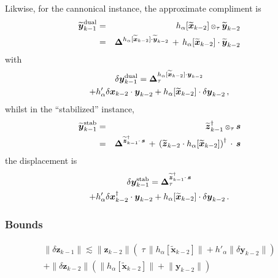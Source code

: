 \documentclass[letterpaper,twocolumn,amsmath,amsfont,amssymb,english,aps,jcp,preprintnumbers,groupaddress,nofootinbib,tightenlines]{revtex4}
\newcommand{\mat}[1]{\boldsymbol{#1}}
\newcommand{\ot}{ {\scriptstyle \otimes}_{ \tau } }
\begin{document}
Likwise,  for the cannonical instance, the approximate compliment is 
\begin{eqnarray}
\widetilde{\mat{y}}^{\rm dual}_{k-1}&=&  
h_\alpha [ \widetilde{\mat{x}}_{k-2}] \, \ot \, \widetilde{\mat{y}}_{k-2}  \\
&=&  \mat{\Delta}^{  h_\alpha[ \widetilde{\mat{x}}_{k-2}] \cdot \widetilde{\mat{y}}_{k-2} }  \, + \,
     h_\alpha[ \widetilde{\mat{x}}_{k-2}] \cdot \widetilde{\mat{y}}_{k-2} 
\end{eqnarray}
with 
\begin{multline}
\delta \mat{y}^{\rm dual}_{k-1}= \mat{\Delta}^{
h_\alpha [ \widetilde{\mat{x}}_{k-2}] \cdot \mat{y}_{k-2} }_\tau  \\ +
h'_\alpha \delta \mat{x}_{k-2} \cdot \mat{y}_{k-2}  
+ h_\alpha [ \widetilde{\mat{x}}_{k-2}] \cdot \delta \mat{y}_{k-2} \, ,
\end{multline}
whilst in the ``stabilized'' instance, 
\begin{eqnarray}
\widetilde{\mat{y}}^{\rm stab}_{k-1} &=& \widetilde{\mat{z}}^{\dagger}_{k-1} \, \ot \, \mat{s} \\
                                  &=& \mat{\Delta}^{\widetilde{\mat{z}}^\dagger_{k-1} \cdot \, \mat{s}} \, + \,
\left( \widetilde{\mat{z}}_{k-2} \cdot h_\alpha[ \widetilde{\mat{x}}_{k-2}] \right)^\dagger \, \cdot \, \mat{s}
\end{eqnarray}
the displacement is
\begin{multline}
\delta \mat{y}^{\rm stab}_{k-1}= \mat{\Delta}^{\widetilde{\mat{z}}^\dagger_{k-1} \cdot \, \mat{s}}_\tau  \\ +
h'_\alpha \delta \mat{x}^\dagger_{k-2} \cdot \mat{y}_{k-2}  
+ h_\alpha [ \widetilde{\mat{x}}_{k-2}] \cdot \delta \mat{y}_{k-2}  \,.
\end{multline}

\subsubsection{Bounds}

\begin{multline}
\lVert \delta {\mat{z}}_{k-1} \rVert \lesssim
\lVert \mat{z}_{k-2} \rVert \left( \;  \tau \, \lVert h_\alpha \left[\widetilde{\mat{x}}_{k-2} \right]  \rVert
+ h'_\alpha \lVert \delta {\mat{y}}_{k-2} \rVert  \right)  \\ +
\lVert \delta {\mat{z}}_{k-2} \rVert  \left( \lVert h_\alpha \left[\widetilde{\mat{x}}_{k-2} \right]  \rVert + 
\lVert  {\mat{y}}_{k-2} \rVert \right)
\end{multline}
\end{document}
